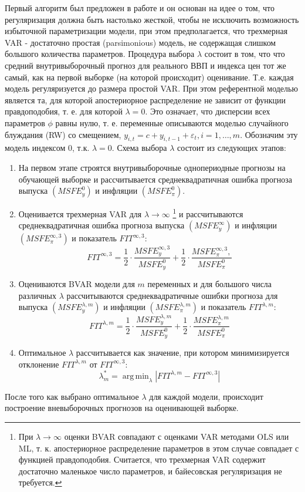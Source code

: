\documentclass[11pt]{article} %
\DeclareMathOperator*{\argmin}{arg\,min}
\begin{document}
Первый алгоритм был предложен в работе \cite{banbura_al_2010_large} и он основан на идее о том, что регуляризация должна быть настолько жесткой, чтобы не исключить возможность избыточной параметризации модели, при этом предполагается, что трехмерная VAR - достаточно простая (parsimonious) модель, не содержащая слишком большого количества параметров. Процедура выбора $\lambda$ состоит в том, что что средний внутривыборочный прогноз для реального ВВП и индекса цен тот же самый, как на первой выборке (на которой происходит) оценивание. Т.е. каждая модель регуляризуется до размера простой VAR. При этом  референтной моделью является та, для которой апостериорное распределение не зависит от функции правдоподобия, т. е. для которой $\lambda=0$. Это означает, что дисперсии всех параметров $\phi$ равны нулю, т. е. переменные описываются моделью случайного блуждания (RW) со смещением, $y_{i,t}=c+y_{i,t-1} +\varepsilon_t, i=1,\ldots,m$. Обозначим эту модель индексом 0,  т.к. $\lambda=0$.
Схема выбора $\lambda$ состоит из следующих этапов:
\begin{enumerate}
\item На первом этапе  строятся внутривыборочные однопериодные прогнозы на обучающей выборке и рассчитывается среднеквадратичная ошибка прогноза выпуска $(MSFE_y^{0})$ и инфляции $(MSFE_{\pi}^{0})$.
\item Оценивается трехмерная VAR для $\lambda\to \infty$ \footnote{При $\lambda\to \infty$ оценки BVAR совпадают с оценками VAR методами OLS или ML, т. к. апостериорное распределение параметров в этом случае совпадает с функцией правдоподобия. Считается, что трехмерная VAR содержит достаточно маленькое число параметров, и байесовская регуляризация не требуется.} и рассчитываются среднеквадратичная ошибка прогноза выпуска $(MSFE_y^{\infty})$ и инфляции $(MSFE_{\pi}^{\infty,3})$ и показатель $FIT^{\infty,3}$:
\begin{equation}
FIT^{\infty,3}=\frac{1}{2}\cdot\frac{MSFE_y^{\infty,3}}{MSFE^0_y} + \frac{1}{2}\cdot\frac{MSFE_{\pi}^{\infty,3},}{MSFE^0_{\pi}}
\end{equation}
\item Оцениваются BVAR модели для $m$ переменных и для большого числа различных $\lambda$ рассчитываются среднеквадратичные ошибки прогноза для выпуска $(MSFE_y^{\lambda,m})$ и инфляции $(MSFE_{\pi}^{\lambda,m})$ и показатель $FIT^{{\lambda,m}}$: 
\begin{equation}
FIT^{\lambda,m}=\frac{1}{2}\cdot\frac{MSFE_y^{\lambda,m}}{MSFE^0_y} + \frac{1}{2}\cdot\frac{MSFE_{\pi}^{\lambda,m}}{MSFE^0_{\pi}}
\end{equation}
\item Оптимальное $\lambda$ рассчитывается как значение, при котором минимизируется отклонение $FIT^{\lambda,m}$ от $FIT^{\infty,3}$:
\begin{equation}
\lambda^*_m=\argmin_{\lambda} |FIT^{\lambda, m}-FIT^{\infty,3}| 
\end{equation}
\end{enumerate}
После того как выбрано оптимальное $\lambda$ для каждой модели, происходит построение вневыборочных прогнозов на оценивающей выборке.
\end{document}
